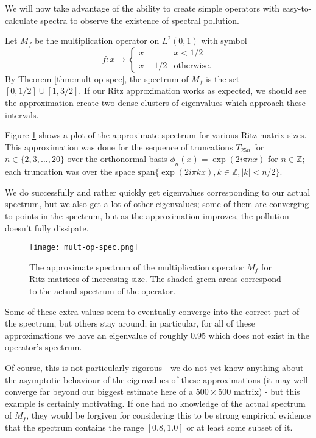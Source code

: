 \documentclass[../main.tex]{subfiles}
\begin{document}
We will now take advantage of the ability to create simple operators with easy-to-calculate
spectra to observe the existence of spectral pollution.

\begin{example}
Let $M_f$ be the multiplication operator on $L^2(0, 1)$ with symbol
$$
f: x \mapsto \begin{cases}
x & x < 1/2 \\
x + 1/2 & \text{otherwise.}
\end{cases}
$$
By Theorem \ref{thm:mult-op-spec}, the spectrum of $M_f$ is the set $[0, 1/2]
\cup [1, 3/2]$. If our Ritz approximation works as expected, we should
see the approximation create two dense clusters of eigenvalues which
approach these intervals.
\end{example}

Figure \ref{fig:mult-op-spec} shows a plot of the approximate spectrum for
various Ritz matrix sizes. This approximation was done for the sequence of
truncations $T_{25n}$ for $n \in \{2, 3, \hdots, 20\}$ over the orthonormal
basis $\phi_n(x) = \exp(2 i \pi n x)$ for $n \in \mathbb{Z}$; each truncation
was over the space $\mathrm{span}\{\exp(2 i \pi k x), k \in \mathbb{Z}, |k| < n/2\}$.

We do successfully and rather quickly get eigenvalues corresponding to our
actual spectrum, but we also get a lot of other eigenvalues; some of them are
converging to points in the spectrum, but as the approximation improves, the
pollution doesn't fully dissipate.

\begin{figure}[h]
\centering
\texttt{[image: mult-op-spec.png]}
\caption{The approximate spectrum of the multiplication operator $M_f$ for Ritz
	matrices of increasing size. The shaded green areas correspond to the
	actual spectrum of the operator.}
\label{fig:mult-op-spec}	
\end{figure}

Some of these extra values seem to eventually converge into the correct part of
the spectrum, but others stay around; in particular, for all of these
approximations we have an eigenvalue of roughly 0.95 which does not exist in the
operator's spectrum.

Of course, this is not particularly rigorous - we do not yet know anything about
the asymptotic behaviour of the eigenvalues of these approximations (it may well
converge far beyond our biggest estimate here of a $500 \times 500$ matrix) -
but this example is certainly motivating. If one had no knowledge of the actual
spectrum of $M_f$, they would be forgiven for considering this to be strong
empirical evidence that the spectrum contains the range $[0.8, 1.0]$ or at least
some subset of it. 
\end{document}
